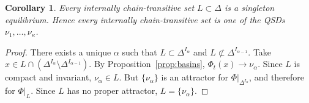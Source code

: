 \documentclass[10pt,letterpaper]{article}
\theoremstyle{compactplain}
\newtheorem{corollary}[theorem]{Corollary}
\theoremstyle{compactdefinition}
\newcommand{\1}{\mathds{1}}
\begin{document}
\begin{corollary}
\label{CRset}
Every internally chain-transitive set \(L\subset\Delta\) is a singleton equilibrium. Hence every internally chain-transitive set is one of the QSDs \(\nu_1,\ldots,\nu_\kappa\).
\end{corollary}

\begin{proof}
There exists a unique \(\alpha\) such that \(L\subset\Delta^{I_\alpha}\) and \(L\not\subset\Delta^{I_{\alpha-1}}\). Take \(x\in L\cap(\Delta^{I_\alpha}\setminus\Delta^{I_{\alpha-1}})\). By Proposition~\ref{prop:basins}, \(\Phi_t(x)\to\nu_\alpha\). Since \(L\) is compact and invariant, \(\nu_\alpha\in L\). But \(\{\nu_\alpha\}\) is an attractor for \(\Phi|_{\Delta^{I_\alpha}}\), and therefore for \(\Phi|_L\). Since \(L\) has no proper attractor, \(L=\{\nu_\alpha\}\).
\end{proof}
\end{document}
